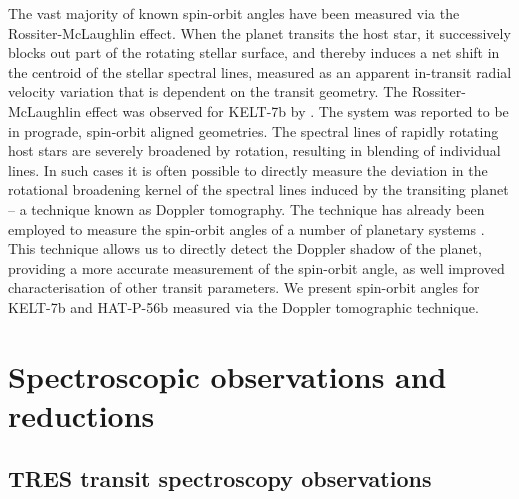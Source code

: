 \documentclass[useAMS,usenatbib]{mn2e}
\begin{document}
The vast majority of known spin-orbit angles have been measured via the Rossiter-McLaughlin effect. When the planet transits the host star, it successively blocks out part of the rotating stellar surface, and thereby induces a net shift in the centroid of the stellar spectral lines, measured as an apparent in-transit radial velocity variation that is dependent on the transit geometry. The Rossiter-McLaughlin effect was observed for KELT-7b by \citet{2015AJ....150...12B}. The system was reported to be in prograde, spin-orbit aligned geometries. The spectral lines of rapidly rotating host stars are severely broadened by rotation, resulting in blending of individual lines. In such cases it is often possible to directly measure the deviation in the rotational broadening kernel of the spectral lines induced by the transiting planet -- a technique known as Doppler tomography. The technique has already been employed to measure the spin-orbit angles of a number of planetary systems \citep{2010MNRAS.403..151C,2010MNRAS.407..507C,2010A&amp;A...523A..52M,2012ApJ...760..139B,2012A&amp;A...543L...5G,2013ApJ...771...11A,2014ApJ...790...30J,2015ApJ...810L..23J,2015AJ....150..197H}. This technique allows us to directly detect the Doppler shadow of the planet, providing a more accurate measurement of the spin-orbit angle, as well improved characterisation of other transit parameters. We present spin-orbit angles for KELT-7b and HAT-P-56b measured via the Doppler tomographic technique.

\section{Spectroscopic observations and reductions}
\label{sec:obs_and_analyses}

\subsection{TRES transit spectroscopy observations}
\label{sec:tres}
\end{document}
